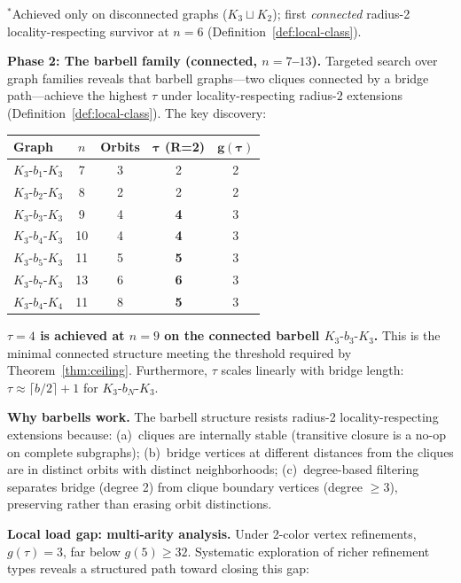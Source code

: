 \documentclass[11pt,a4paper]{article}
\theoremstyle{definition}
\theoremstyle{remark}
\begin{document}
{\footnotesize ${}^*$Achieved only on disconnected graphs ($K_3 \sqcup K_2$); first \emph{connected} radius-2 locality-respecting survivor at $n = 6$ (Definition~\ref{def:local-class}).}

\textbf{Phase 2: The barbell family (connected, $n = 7$--$13$).} Targeted search over graph families reveals that barbell graphs---two cliques connected by a bridge path---achieve the highest $\tau$ under locality-respecting radius-$2$ extensions (Definition~\ref{def:local-class}). The key discovery:

\begin{center}
\begin{tabular}{lcccc}
\toprule
\textbf{Graph} & \textbf{$n$} & \textbf{Orbits} & $\boldsymbol{\tau}$ \textbf{(R=2)} & $\boldsymbol{g(\tau)}$ \\
\midrule
$K_3\text{-}b_1\text{-}K_3$ & 7 & 3 & 2 & 2 \\
$K_3\text{-}b_2\text{-}K_3$ & 8 & 2 & 2 & 2 \\
$K_3\text{-}b_3\text{-}K_3$ & 9 & 4 & \textbf{4} & 3 \\
$K_3\text{-}b_4\text{-}K_3$ & 10 & 4 & \textbf{4} & 3 \\
$K_3\text{-}b_5\text{-}K_3$ & 11 & 5 & \textbf{5} & 3 \\
$K_3\text{-}b_7\text{-}K_3$ & 13 & 6 & \textbf{6} & 3 \\
$K_3\text{-}b_4\text{-}K_4$ & 11 & 8 & \textbf{5} & 3 \\
\bottomrule
\end{tabular}
\end{center}

\textbf{$\tau = 4$ is achieved at $n = 9$ on the connected barbell $K_3\text{-}b_3\text{-}K_3$.} This is the minimal connected structure meeting the threshold required by Theorem~\ref{thm:ceiling}. Furthermore, $\tau$ scales linearly with bridge length: $\tau \approx \lceil b/2 \rceil + 1$ for $K_3$-$b_N$-$K_3$.

\textbf{Why barbells work.} The barbell structure resists radius-2 locality-respecting extensions because:
(a)~cliques are internally stable (transitive closure is a no-op on complete subgraphs);
(b)~bridge vertices at different distances from the cliques are in distinct orbits with distinct neighborhoods;
(c)~degree-based filtering separates bridge (degree 2) from clique boundary vertices (degree $\geq 3$), preserving rather than erasing orbit distinctions.

\textbf{Local load gap: multi-arity analysis.} Under 2-color vertex refinements, $g(\tau) = 3$, far below $g(5) \geq 32$. Systematic exploration of richer refinement types reveals a structured path toward closing this gap:
\end{document}
